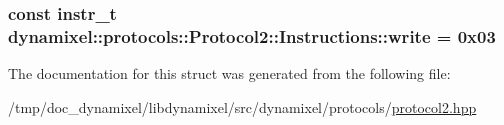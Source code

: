 \subsubsection[{\texorpdfstring{write}{write}}]{\setlength{\rightskip}{0pt plus 5cm}const {\bf instr\+\_\+t} dynamixel\+::protocols\+::\+Protocol2\+::\+Instructions\+::write = 0x03\hspace{0.3cm}{\ttfamily [static]}}\hypertarget{structdynamixel_1_1protocols_1_1_protocol2_1_1_instructions_a8962296bdcb1cc06e0a27d0e6a005bf4}{}\label{structdynamixel_1_1protocols_1_1_protocol2_1_1_instructions_a8962296bdcb1cc06e0a27d0e6a005bf4}


The documentation for this struct was generated from the following file\+:\begin{DoxyCompactItemize}
\item 
/tmp/doc\+\_\+dynamixel/libdynamixel/src/dynamixel/protocols/\hyperlink{protocol2_8hpp}{protocol2.\+hpp}\end{DoxyCompactItemize}

